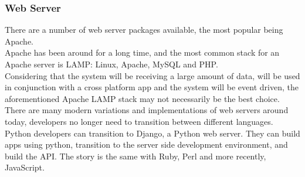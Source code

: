 \documentclass[preprint,12pt,3p]{elsarticle}
\begin{document}
\subsubsection{Web Server}
There are a number of web server packages available, the most popular being Apache.\\
Apache has been around for a long time, and the most common stack for an Apache server is LAMP: Linux, Apache, MySQL and PHP.\\
Considering that the system will be receiving a large amount of data, will be used in conjunction with a cross platform app and the system will be event driven, the aforementioned Apache LAMP stack may not necessarily be the best choice.\\
There are many modern variations and implementations of web servers around today, developers no longer need to transition between different languages. Python developers can transition to Django, a Python web server. They can build apps using python, transition to the server side development environment, and build the API. The story is the same with Ruby, Perl and more recently, JavaScript.\\
\end{document}
